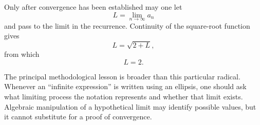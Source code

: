 \documentclass{essay}
\begin{document}
Only after convergence has been established may one let
\[ L=\lim_{n\to\infty}a_{n} \]
and pass to the limit in the recurrence. Continuity of the square-root function gives
\[ L=\sqrt{2+L}, \]
from which
\[ L=2. \]

The principal methodological lesson is broader than this particular radical. Whenever an ``infinite expression'' is written using an ellipsis, one should ask what limiting process the notation represents and whether that limit exists. Algebraic manipulation of a hypothetical limit may identify possible values, but it cannot substitute for a proof of convergence.
\end{document}
